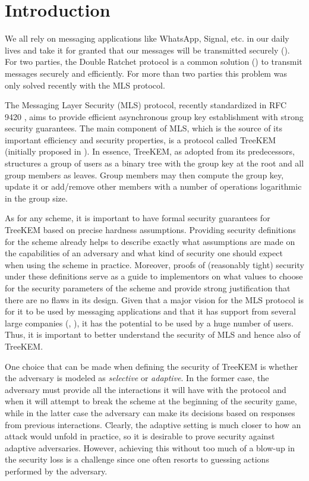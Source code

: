 \chapter{Introduction}


We all rely on messaging applications like WhatsApp, Signal, etc. in our daily lives and take it for granted
that our messages will be transmitted securely ().
For two parties, the Double Ratchet protocol is a common solution () to transmit messages
securely and efficiently. For more than two parties this problem was only solved recently with the MLS protocol.


The Messaging Layer Security (MLS) protocol, recently standardized in RFC 9420 \cite{rfc9420}, aims to provide efficient asynchronous group key establishment with strong security guarantees. The main component of MLS, which is the source of its important efficiency and security properties, is a protocol called TreeKEM (initially proposed in \cite{tkem}). In essence, TreeKEM, as adopted from its predecessors, structures a group of users as a binary tree with the group key at the root and all group members as leaves. Group members may then compute the group key, update it or add/remove other members with a number of operations logarithmic in the group size.

As for any scheme, it is important to have formal security guarantees for TreeKEM based on precise hardness assumptions. Providing security definitions for the scheme already helps to describe exactly what assumptions are made on the capabilities of an adversary and what kind of security one should expect when using the scheme in practice. Moreover, proofs of (reasonably tight) security under these definitions serve as a guide to implementors on what values to choose for the security parameters of the scheme and provide strong justification that there are no flaws in its design. Given that a major vision for the MLS protocol is for it to be used by messaging applications and that it has support from several large companies (\cite{google-mls}, \cite{mls-support}), it has the potential to be used by a huge number of users. Thus, it is important to better understand the security of MLS and hence also of TreeKEM.

One choice that can be made when defining the security of TreeKEM is whether the adversary is modeled as \emph{selective} or \emph{adaptive}. In the former case, the adversary must provide all the interactions it will have with the protocol and when it will attempt to break the scheme at the beginning of the security game, while in the latter case the adversary can make its decisions based on responses from previous interactions. Clearly, the adaptive setting is much closer to how an attack would unfold in practice, so it is desirable to prove security against adaptive adversaries. However, achieving this without too much of a blow-up in the security loss is a challenge since one often resorts to guessing actions performed by the adversary.

